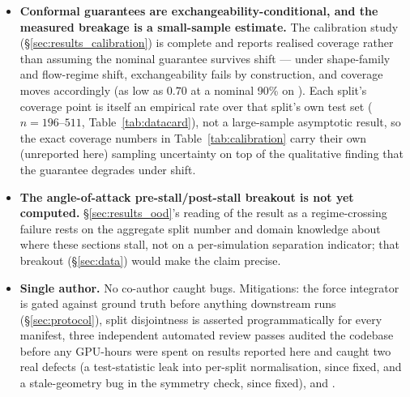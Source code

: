 \documentclass[11pt,a4paper]{article}
\begin{document}
\begin{itemize}
        rather than hide.
  \item \textbf{Conformal guarantees are exchangeability-conditional, and the
        measured breakage is a small-sample estimate.} The calibration study
        (\S\ref{sec:results_calibration}) is complete and reports realised
        coverage rather than assuming the nominal guarantee survives shift
        \citep{tibshirani2019covariateshift} --- under shape-family and
        flow-regime shift, exchangeability fails by construction, and coverage
        moves accordingly (as low as $0.70$ at a nominal 90\% on
        ). Each split's coverage point is itself an
        empirical rate over that split's own test set ($n=196$--$511$,
        Table~\ref{tab:datacard}), not a large-sample asymptotic result, so the
        exact coverage numbers in Table~\ref{tab:calibration} carry their own
        (unreported here) sampling uncertainty on top of the qualitative
        finding that the guarantee degrades under shift.
  \item \textbf{The angle-of-attack pre-stall/post-stall breakout is not yet
        computed.} \S\ref{sec:results_ood}'s reading of the 
        result as a regime-crossing failure rests on the aggregate split
        number and domain knowledge about where these sections stall, not on
        a per-simulation separation indicator; that breakout
        (\S\ref{sec:data}) would make the claim precise.
  \item \textbf{Single author.} No co-author caught bugs. Mitigations: the
        force integrator is gated against ground truth before anything
        downstream runs (\S\ref{sec:protocol}), split disjointness is asserted
        programmatically for every manifest, three independent automated
        review passes audited the codebase before any GPU-hours were spent on
        results reported here and caught two real defects (a test-statistic
        leak into per-split normalisation, since fixed, and a stale-geometry
        bug in the symmetry check, since fixed), and .
\end{itemize}
\end{document}
